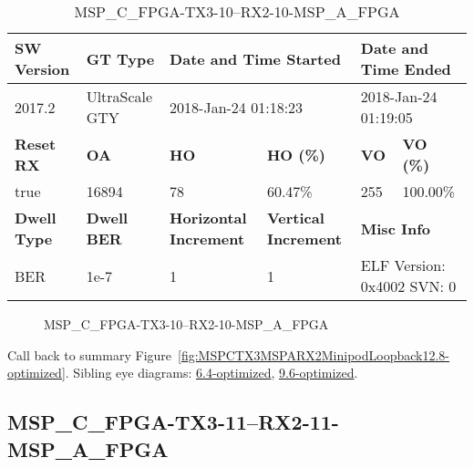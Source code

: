 \begin{table}[h]
\centering
\caption{MSP\_C\_FPGA-TX3-10--RX2-10-MSP\_A\_FPGA}
\label{tab:MSPCFPGATX310RX210MSPAFPGA12.8-optimized}
\begin{tabular}{@{}|l|l|l|l|l|l|@{}}
\toprule
\textbf{SW Version}                & \textbf{GT Type}   & \multicolumn{2}{l|}{\textbf{Date and Time Started}}            & \multicolumn{2}{l|}{\textbf{Date and Time Ended}}        \\ \midrule
2017.2                       & UltraScale GTY          & \multicolumn{2}{l|}{2018-Jan-24 01:18:23}                   & \multicolumn{2}{l|}{2018-Jan-24 01:19:05}               \\ \midrule
\textbf{Reset RX}                  & \textbf{OA} & \textbf{HO}   & \textbf{HO (\%)} & \textbf{VO} & \textbf{VO (\%)} \\ \midrule
true & 16894        & 78          & 60.47\%        & 255        & 100.00\%       \\ \midrule
\textbf{Dwell Type}                & \textbf{Dwell BER} & \textbf{Horizontal Increment} & \textbf{Vertical Increment}    & \multicolumn{2}{l|}{\textbf{Misc Info}}                  \\ \midrule
BER                            & 1e-7        & 1        & 1           & \multicolumn{2}{l|}{ELF Version: 0x4002 SVN: 0}                         \\ \bottomrule
\end{tabular}
\end{table}

\begin{figure}[h]
\caption{MSP\_C\_FPGA-TX3-10--RX2-10-MSP\_A\_FPGA} \label{fig:MSPCFPGATX310RX210MSPAFPGA12.8-optimized}
\end{figure}

Call back to summary Figure~\ref{fig:MSPCTX3MSPARX2MinipodLoopback12.8-optimized}.
Sibling eye diagrams: \hyperref[sec:MSPCFPGATX310RX210MSPAFPGA6.4-optimized]{6.4-optimized}, \hyperref[sec:MSPCFPGATX310RX210MSPAFPGA9.6-optimized]{9.6-optimized}.

\clearpage
\newpage


\subsection{MSP\_C\_FPGA-TX3-11--RX2-11-MSP\_A\_FPGA}\label{sec:MSPCFPGATX311RX211MSPAFPGA12.8-optimized}

